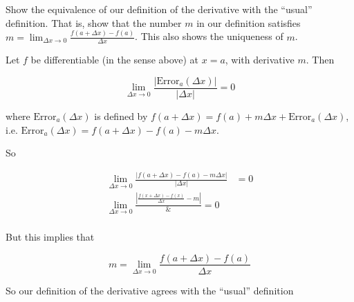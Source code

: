 \documentclass{ximera}
\begin{document}
Show the equivalence of our definition of the derivative with the ``usual'' definition.  That is, show that the number $m$ in our definition satisfies
$m = \lim_{\Delta x \to 0}\frac{f(a+\Delta x)-f(a)}{\Delta x}$.  This also shows the uniqueness of $m$.

\begin{free-response}
  Let $f$ be differentiable (in the sense above) at $x=a$, with derivative $m$.  Then 
  
  \[ \lim_{\Delta x \to 0} \frac{\left|\text{Error}_a(\Delta x)\right|}{\left|\Delta x\right|} = 0 \]
  
  where $\text{Error}_a(\Delta x)$ is defined by $f(a+\Delta x) = f(a) + m\Delta x + \text{Error}_a(\Delta x)$, i.e. $\text{Error}_a(\Delta x) = f(a+\Delta x) - f(a) -m\Delta x$.
  
  So 
  
  \begin{align*}
    \lim_{\Delta x \to 0} \frac{\left|f(a+\Delta x) - f(a) -m\Delta x\right|}{\left|\Delta x\right|} &= 0\\
    \lim_{\Delta x \to 0} \frac{\left| \frac{f(x+\Delta x) -f(x)}{\Delta x} - m\right|} &= 0\\
  \end{align*}
  
  But this implies that
  
  \[m = \lim_{\Delta x \to 0}\frac{f(a+\Delta x)-f(a)}{\Delta x}\]
  
  So our definition of the derivative agrees with the  ``usual'' definition
  
\end{free-response}
\end{document}
